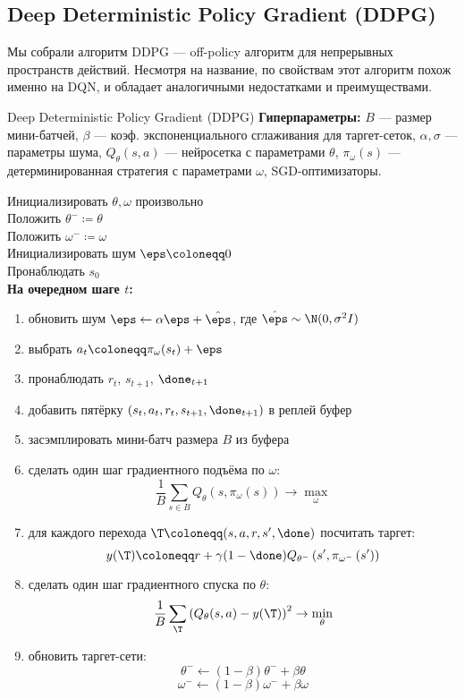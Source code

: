 \subsection{Deep Deterministic Policy Gradient (DDPG)}

Мы собрали алгоритм DDPG --- off-policy алгоритм для непрерывных пространств действий. Несмотря на название, по свойствам этот алгоритм похож именно на DQN, и обладает аналогичными недостатками и преимуществами.

\begin{algorithm}[label = DDPGalgorithm]{Deep Deterministic Policy Gradient (DDPG)}
\textbf{Гиперпараметры:} $B$ --- размер мини-батчей, $\beta$ --- коэф. экспоненциального сглаживания для таргет-сеток, $\alpha, \sigma$ --- параметры шума, $Q_{\theta}(s, a)$ --- нейросетка с параметрами $\theta$, $\pi_{\omega}(s)$ --- детерминированная стратегия с параметрами $\omega$, SGD-оптимизаторы.

\vspace{0.3cm}
Инициализировать $\theta, \omega$ произвольно \\
Положить $\theta^- \coloneqq \theta$ \\
Положить $\omega^- \coloneqq \omega$ \\
Инициализировать шум $\eps \coloneqq 0$ \\
Пронаблюдать $s_0$ \\
\textbf{На очередном шаге $t$:}
\begin{enumerate}
    \item обновить шум $\eps \leftarrow \alpha \eps + \hat{\eps}$, где $\hat{\eps} \sim \N(0, \sigma^2 I)$
    \item выбрать $a_t \coloneqq \pi_\omega(s_t) + \eps$
    \item пронаблюдать $r_t$,  $s_{t+1}$, $\done_{t+1}$
    \item добавить пятёрку $(s_t, a_t, r_t, s_{t+1}, \done_{t+1})$ в реплей буфер
    \item засэмплировать мини-батч размера $B$ из буфера
    \item сделать один шаг градиентного подъёма по $\omega$:
    $$\frac{1}{B}\sum_{s \in B} Q_{\theta}(s, \pi_\omega(s)) \to \max_{\omega}$$
    \item для каждого перехода $\T \coloneqq (s, a, r, s', \done)$ посчитать таргет:
    $$y(\T ) \coloneqq r + \gamma (1 - \done) Q_{\theta^{-}} \left( s', \pi_{\omega^{-}} \left( s' \right) \right)$$
    \item сделать один шаг градиентного спуска по $\theta$:
    $$\frac{1}{B}\sum_{\T} \left( Q_{\theta}(s, a) - y(\T ) \right) ^2 \to \min_\theta$$
    \item обновить таргет-сети: 
        $$\theta^{-} \gets (1 - \beta) \theta^{-} + \beta \theta$$
        $$\omega^{-} \gets (1 - \beta) \omega^{-} + \beta \omega$$
\end{enumerate}
\end{algorithm}

